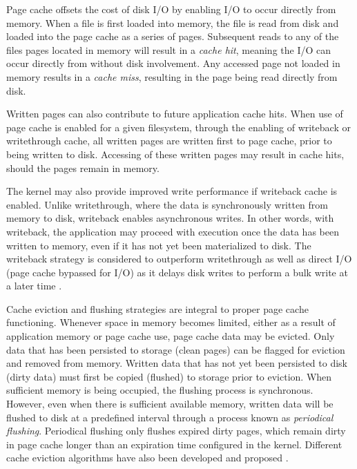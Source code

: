 \documentclass[conference]{IEEEtran}
\begin{document}
        Page cache offsets the cost of disk I/O by enabling I/O to occur directly from memory.
        When a file is first loaded into memory, the file is read from disk and loaded into the page cache as
        a series of pages. Subsequent reads to any of the files pages located in memory will result in
        a \textit{cache hit}, meaning the I/O can occur directly from without disk involvement.
        Any accessed page not loaded in memory results in a \textit{cache miss}, resulting in
        the page being read directly from disk.
        
        Written pages can also contribute to future application cache hits. When use of page cache
        is enabled for a given filesystem, through the enabling of writeback or writethrough cache,
        all written pages are written first to page cache, prior to being written to disk.
        Accessing of these written pages may result in cache hits, should the pages remain in memory.

        The kernel may also provide improved write performance if writeback cache is enabled. Unlike writethrough,
        where the data is synchronously written from memory to disk, writeback enables asynchronous writes.
        In other words, with writeback, the application may proceed with execution once the data has been
        written to memory, even if it has not yet been materialized to disk.  
        The writeback strategy is considered to outperform writethrough as well as
        direct I/O (page cache bypassed for I/O) as it delays disk writes to perform a bulk write at a later time
        \cite{linuxdev3rd2010}.

        Cache eviction and flushing strategies are integral to proper page cache functioning.
        Whenever space in memory becomes limited, either as a result of application memory
        or page cache use, page cache data may be evicted. Only data that
        has been persisted to storage (clean pages) can be flagged for eviction and removed from
        memory. Written data that has not yet been persisted to disk (dirty data) must first
        be copied (flushed) to storage prior to eviction. When sufficient memory is
        being occupied, the flushing process is synchronous. However, even when
        there is sufficient available memory, written data will be flushed to disk
        at a predefined interval through a process known as \textit{periodical flushing}.
        Periodical flushing only flushes expired dirty pages, which remain dirty in
        page cache longer than an expiration time configured in the kernel.
        Different cache eviction algorithms have also been developed and proposed
        \cite{owda2014comparison}.
\end{document}

